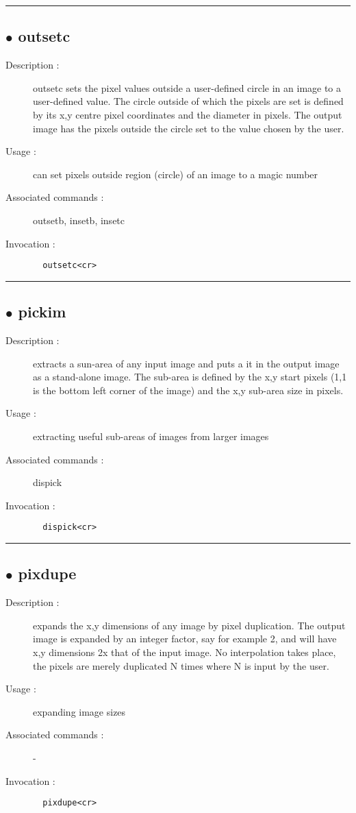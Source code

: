 \hrule \subsection*{$\bullet$ outsetc}
\begin{description}
\item[Description :] outsetc sets the pixel values outside a user-defined circle in
an image to a user-defined value.  The circle outside of which the pixels
are set is defined by its x,y centre pixel coordinates and the diameter
in pixels.  The output image has the pixels outside the circle set to the
value chosen by the user.
\item[Usage :] can set pixels outside region (circle) of an image to a magic
number
\item[Associated commands :] outsetb, insetb, insetc
\item[Invocation :]

\verb+  outsetc<cr> +\end{description}

\hrule \subsection*{$\bullet$ pickim}
\begin{description}
\item[Description :] extracts a sun-area of any input image and puts a it in the
output image as a stand-alone image.  The sub-area is defined by the 
x,y start pixels (1,1 is the bottom left corner of the image) and the
x,y sub-area size in pixels.  
\item[Usage :] extracting useful sub-areas of images from larger images
\item[Associated commands :] dispick
\item[Invocation :]

\verb+  dispick<cr> +\end{description}

\hrule \subsection*{$\bullet$ pixdupe}
\begin{description}
\item[Description :] expands the x,y dimensions of any image by pixel duplication.
The output image is expanded by an integer factor, say for example 2,
and will have x,y dimensions 2x that of the input image.  No interpolation
takes place, the pixels are merely duplicated N times where N is input by
the user.
\item[Usage :] expanding image sizes
\item[Associated commands :] -
\item[Invocation :]

\verb+  pixdupe<cr> +\end{description}

